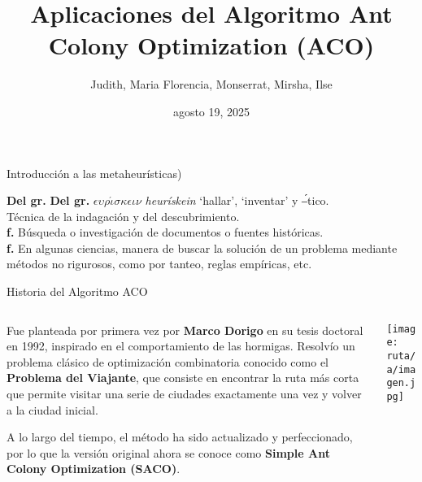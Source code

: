 \documentclass{beamer}
\title{Aplicaciones del Algoritmo Ant Colony Optimization (ACO)}
\author{Judith, Maria Florencia, Monserrat, Mirsha, Ilse}
\date{agosto 19, 2025}
\begin{document}
\frame{\titlepage}


\begin{frame}{Introducción a las metaheurísticas)}

\justifying
\textbf{Del gr.} \textbf{Del gr.} $\epsilon\upsilon\rho\acute{\iota}\sigma\kappa\epsilon\iota\nu$ 
 \textit{heurískein} `hallar', `inventar' y ‒́tico.\\[0.5em]
Técnica de la indagación y del descubrimiento.\\[0.5em]
\textbf{f.} Búsqueda o investigación de documentos o fuentes históricas.\\[0.5em]
\textbf{f.} En algunas ciencias, manera de buscar la solución de un problema mediante métodos no rigurosos, como por tanteo, reglas empíricas, etc.
\end{frame}

\begin{frame}{Historia del Algoritmo ACO}
\begin{columns}
    \begin{column}{0.65\textwidth}
        \justifying
        Fue planteada por primera vez por \textbf{Marco Dorigo} en su tesis doctoral en 1992, inspirado en el comportamiento de las hormigas. 
        Resolvío un problema clásico de optimización combinatoria conocido como el \textbf{Problema del Viajante}, que consiste en encontrar la ruta más corta que permite visitar una serie de ciudades exactamente una vez y volver a la ciudad inicial. 
        
        \medskip
        A lo largo del tiempo, el método ha sido actualizado y perfeccionado, por lo que la versión original ahora se conoce como \textbf{Simple Ant Colony Optimization (SACO)}.
    \end{column}

    \begin{column}{0.35\textwidth}
        \centering
        \texttt{[image: ruta/a/imagen.jpg]} %
    \end{column}
\end{columns}
\end{frame}
\end{document}
